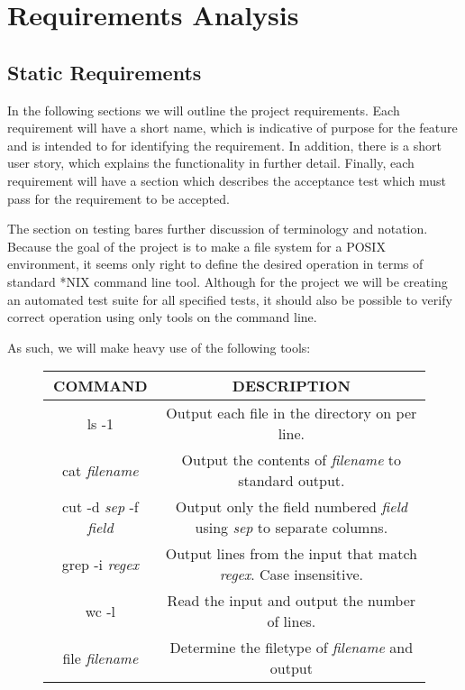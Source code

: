 \section{Requirements Analysis}

\subsection{Static Requirements}

In the following sections we will outline the project requirements. Each
requirement will have a short name, which is indicative of purpose for the
feature and is intended to for identifying the requirement. In addition, there
is a short user story, which explains the functionality in further detail.
Finally, each requirement will have a section which describes the acceptance
test which must pass for the requirement to be accepted.

The section on testing bares further discussion of terminology and notation.
Because the goal of the project is to make a file system for a POSIX
environment, it seems only right to define the desired operation in terms of
standard *NIX command line tool. Although for the project we will be creating an
automated test suite for all specified tests, it should also be possible to
verify correct operation using only tools on the command line.

As such, we will make heavy use of the following tools:

\begin{figure}[H]
\centering
\begin{tabular}{|c|c|}
\hline
COMMAND & DESCRIPTION \\\hline

ls -1 & Output each file in the directory on per line.\\

cat \textit{filename} & Output the contents of \textit{filename} to standard
output.\\

cut -d \textit{sep} -f \textit{field} & Output only the field numbered
\textit{field} using \textit{sep} to separate columns.\\

grep -i \textit{regex} & Output lines from the input that match \textit{regex}.
Case insensitive.\\

wc -l & Read the input and output the number of lines.\\

file \textit{filename} & Determine the filetype of \textit{filename} and output\\\hline
\end{tabular}
\end{figure}

